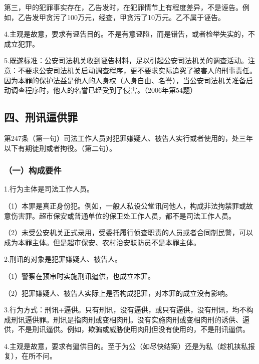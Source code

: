 第三，甲的犯罪事实存在，乙告发时，在犯罪情节上有程度差异，不是诬告。例如，乙告发甲贪污了100万元，经查，甲贪污了10万元。乙不属于诬告。

4.主观是故意，要求有诬告目的。不是有意诬陷，而是错告，或者检举失实的，不成立犯罪。

5.既遂标准：公安司法机关收到诬告材料，足以引起公安司法机关的调查活动。注意：不要求公安司法机关启动调查程序，更不要求实际追究了被害人的刑事责任。因为本罪的保护法益是他人的人身权（人身自由、名誉），当公安司法机关准备启动调查程序时，他人的名誉已经受到了侵害。（2006年第54题）


\subsection*{四、刑讯逼供罪}

第247条（第一句）司法工作人员对犯罪嫌疑人、被告人实行或者使用的，处三年以下有期徒刑或者拘役。（第二句）。

\subsubsection*{（一）构成要件}

1.行为主体是司法工作人员。

（1）本罪是真正身份犯。例如，一般人私设公堂讯问他人，构成非法拘禁罪或故意伤害罪。超市保安或普通单位的保卫处工作人员，都不是司法工作人员。

（2）未受公安机关正式录用，受委托履行侦查职责的人员或者合同制民警，可以成为本罪主体。但是超市保安、农村治安联防员不是本罪主体。

2.刑讯的对象是犯罪嫌疑人、被告人。

（1）警察在预审时实施刑讯逼供，也成立本罪。

（2）犯罪嫌疑人、被告人实际上是否构成犯罪，对本罪的成立没有影响。

3.行为方式：刑讯+逼供。只有刑讯，没有逼供，或只有逼供，没有刑讯，均不构成刑讯逼供罪。刑讯是指肉刑或变相肉刑。没有实施肉刑或变相肉刑的诱供、逼供，不是刑讯逼供。例如，欺骗或威胁使用肉刑但没有使用的，不是刑讯逼供。

4.主观是故意，要求有逼供目的。至于为公（如尽快结案）还是为私（趁机挟私报复），在所不问。

